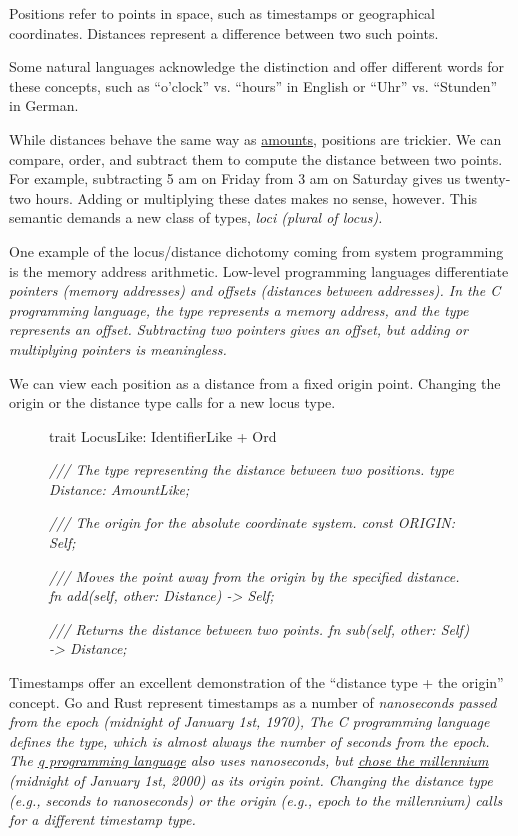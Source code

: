 \documentclass{article}
\begin{document}
Positions refer to points in space, such as timestamps or geographical coordinates.
Distances represent a difference between two such points.

Some natural languages acknowledge the distinction and offer different words for these concepts, such as ``o'clock'' vs. ``hours'' in English or ``Uhr'' vs. ``Stunden'' in German.

While distances behave the same way as \href{#amounts}{amounts}, positions are trickier.
We can compare, order, and subtract them to compute the distance between two points.
For example, subtracting 5 am on Friday from 3 am on Saturday gives us twenty-two hours.
Adding or multiplying these dates makes no sense, however.
This semantic demands a new class of types, \em{loci} (plural of \em{locus}).

One example of the locus/distance dichotomy coming from system programming is the memory address arithmetic.
Low-level programming languages differentiate \em{pointers} (memory addresses) and \em{offsets} (distances between addresses).
In the C programming language, the  type represents a memory address, and the  type represents an offset.
Subtracting two pointers gives an offset, but adding or multiplying pointers is meaningless.

We can view each position as a distance from a fixed origin point.
Changing the origin or the distance type calls for a new locus type.

\begin{figure}
\begin{code}
trait LocusLike: IdentifierLike + Ord {
  \em{/// The type representing the distance between two positions.}
  type Distance: AmountLike;

  \em{/// The origin for the absolute coordinate system.}
  const ORIGIN: Self;

  \em{/// Moves the point away from the origin by the specified distance.}
  fn add(self, other: Distance) -> Self;

  \em{/// Returns the distance between two points.}
  fn sub(self, other: Self) -> Distance;
}
\end{code}
\end{figure}

Timestamps offer an excellent demonstration of the ``distance type + the origin'' concept.
Go and Rust represent timestamps as a number of \em{nanoseconds} passed from the  epoch (midnight of January 1st, 1970),
The C programming language defines the \href{https://en.cppreference.com/w/c/chrono/time_t}{} type, which is almost always the number of \em{seconds} from the  epoch.
The \href{https://en.wikipedia.org/wiki/Q_(programming_language_from_Kx_Systems)}{q programming language} also uses nanoseconds, but \href{https://code.kx.com/q4m3/2_Basic_Data_Types_Atoms/#253-date-time-types}{chose the \em{millennium}} (midnight of January 1st, 2000) as its origin point.
Changing the distance type (e.g., seconds to nanoseconds) or the origin (e.g.,  epoch to the millennium) calls for a different timestamp type.
\end{document}
